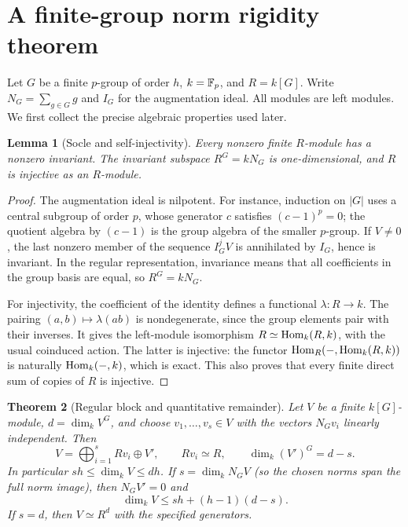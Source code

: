 \documentclass[11pt,a4paper]{article}
\newtheorem{theorem}{Theorem}[section]\newtheorem{proposition}[theorem]{Proposition}\newtheorem{lemma}[theorem]{Lemma}\newtheorem{corollary}[theorem]{Corollary}\theoremstyle{definition}\newtheorem{definition}[theorem]{Definition}\theoremstyle{remark}\newtheorem{remark}[theorem]{Remark}
\numberwithin{equation}{section}
\begin{document}
\section{A finite-group norm rigidity theorem}\label{algebra}
Let $G$ be a finite $p$-group of order $h$, $k=\mathbb F_p$, and $R=k[G]$. Write $N_G=\sum_{g\in G}g$ and $I_G$ for the augmentation ideal. All modules are left modules. We first collect the precise algebraic properties used later.
\begin{lemma}[Socle and self-injectivity]\label{socle}
Every nonzero finite $R$-module has a nonzero invariant. The invariant subspace $R^G=kN_G$ is one-dimensional, and $R$ is injective as an $R$-module.
\end{lemma}
\begin{proof}
The augmentation ideal is nilpotent. For instance, induction on $|G|$ uses a central subgroup of order $p$, whose generator $c$ satisfies $(c-1)^p=0$; the quotient algebra by $(c-1)$ is the group algebra of the smaller $p$-group. If $V\ne0$, the last nonzero member of the sequence $I_G^jV$ is annihilated by $I_G$, hence is invariant. In the regular representation, invariance means that all coefficients in the group basis are equal, so $R^G=kN_G$.

For injectivity, the coefficient of the identity defines a functional $\lambda:R\to k$. The pairing $(a,b)\mapsto\lambda(ab)$ is nondegenerate, since the group elements pair with their inverses. It gives the left-module isomorphism $R\simeq\operatorname{Hom}_k(R,k)$, with the usual coinduced action. The latter is injective: the functor $\operatorname{Hom}_R(-,\operatorname{Hom}_k(R,k))$ is naturally $\operatorname{Hom}_k(-,k)$, which is exact. This also proves that every finite direct sum of copies of $R$ is injective.
\end{proof}
\begin{theorem}[Regular block and quantitative remainder]\label{block}
Let $V$ be a finite $k[G]$-module, $d=\dim_k V^G$, and choose $v_1,\ldots,v_s\in V$ with the vectors $N_Gv_i$ linearly independent. Then
\begin{equation}\label{blockeq}
V=\bigoplus_{i=1}^s Rv_i\oplus V',\qquad Rv_i\simeq R,\qquad \dim_k(V')^G=d-s.
\end{equation}
In particular $s h\le\dim_kV\le d h$. If $s=\dim_kN_G V$ (so the chosen norms span the full norm image), then $N_GV'=0$ and
\begin{equation}\label{improved}
\dim_k V\le sh+(h-1)(d-s).
\end{equation}
If $s=d$, then $V\simeq R^d$ with the specified generators.
\end{theorem}
\end{document}
